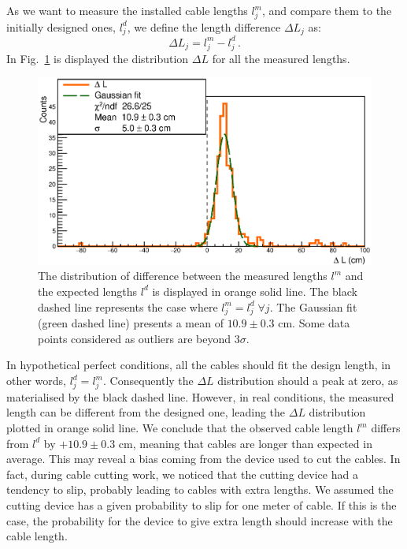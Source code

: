 As we want to measure the installed cable lengths $l^{m}_{j}$, and compare them to the initially designed ones, $l^{d}_{j}$, we define the length difference $\Delta L_{j}$ as:
\begin{equation}
  \Delta L_{j} = l^{m}_{j}-l^{d}_{j}\, .
\end{equation}
In Fig.~\ref{fig:LengthDiff} is displayed the distribution $\Delta L$ for all the measured lengths.
\begin{figure}[h]
  \centering
  \includegraphics[width=15cm]{commissioning/fig_commissioning/length_diff.eps}

  \caption{The distribution of difference between the measured lengths $l^{m}$ and the expected lengths $l^{d}$ is displayed in orange solid line.
    The black dashed line represents the case where $l^{m}_{j} = l^{d}_{j} \;\forall j$.
    The Gaussian fit (green dashed line) presents a mean of $10.9 \pm 0.3$ cm.
    Some data points considered as outliers are beyond $3\sigma$.
    \label{fig:LengthDiff}}
\end{figure}
In hypothetical perfect conditions, all the cables should fit the design length, in other words, $l^{d}_{j} = l^{m}_{j}$.
Consequently the $\Delta L$ distribution should a peak at zero, as materialised by the black dashed line.
However, in real conditions, the measured length can be different from the designed one, leading the $\Delta L$ distribution plotted in orange solid line.
We conclude that the observed cable length $l^{m}$ differs from $l^{d}$ by $+10.9\pm 0.3$ cm, meaning that cables are longer than expected in average.
This may reveal a bias coming from the device used to cut the cables.
In fact, during cable cutting work, we noticed that the cutting device had a tendency to slip, probably leading to cables with extra lengths.
We assumed the cutting device has a given probability to slip for one meter of cable.
If this is the case, the probability for the device to give extra length should increase with the cable length.

